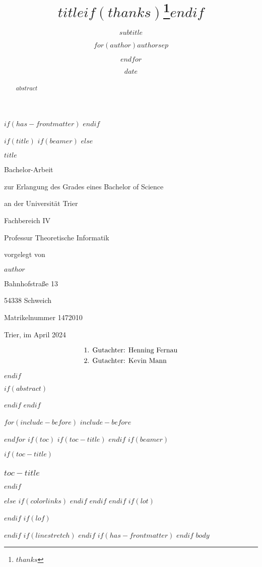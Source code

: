 \documentclass[
  $if(fontsize)$
  $fontsize$,
  $endif$
  $if(lang)$
  $babel-lang$,
  $endif$
  $if(papersize)$
  $papersize$paper,
  $endif$
  $if(beamer)$
  ignorenonframetext,
  $if(handout)$
  handout,
  $endif$
  $if(aspectratio)$
  aspectratio=$aspectratio$,
  $endif$
  $endif$
  $for(classoption)$
  $classoption$$sep$,
  $endfor$
]{$documentclass$}
\title{$title$$if(thanks)$\thanks{$thanks$}$endif$}
\subtitle{$subtitle$}
\author{$for(author)$$author$$sep$ \and $endfor$}
\date{$date$}
\institute{$for(institute)$$institute$$sep$ \and $endfor$}
\begin{document}
$if(has-frontmatter)$
\frontmatter
$endif$

$if(title)$
$if(beamer)$
\frame{\titlepage}
$else$
\begin{titlepage}
  \begin{center}
    \vspace*{1cm}

    \Huge
    \textbf{$title$}

    \vspace{2cm}
    \Large

    Bachelor-Arbeit

    zur Erlangung des Grades eines Bachelor of Science

    \vspace{1cm}

    an der Universität Trier 
    
    Fachbereich IV

    Professur Theoretische Informatik

    \vspace{2cm}
    vorgelegt von

    \textbf{$author$}

    Bahnhofstraße 13

    54338 Schweich

    Matrikelnummer 1472010
    \vfill

    Trier, im April 2024
    \vspace{1cm}


    \begin{align*}
      &\textnormal{1. Gutachter: Henning Fernau}\\
      &\textnormal{2. Gutachter: Kevin Mann}
    \end{align*}
    
    
  \end{center}
\end{titlepage}
$endif$


\clearpage


$if(abstract)$
\begin{abstract}
  $abstract$
\end{abstract}
$endif$
$endif$

$for(include-before)$
$include-before$

$endfor$
$if(toc)$
$if(toc-title)$
\renewcommand*\contentsname{$toc-title$}
$endif$
$if(beamer)$
\begin{frame}[allowframebreaks]
  $if(toc-title)$
  \frametitle{$toc-title$}
  $endif$
  \tableofcontents[hideallsubsections]
\end{frame}
$else$
{
    $if(colorlinks)$
    \hypersetup{linkcolor=$if(toccolor)$$toccolor$$else$$endif$}
    $endif$
    \setcounter{tocdepth}{$toc-depth$}
    \tableofcontents
  }
$endif$
$endif$
$if(lot)$
\listoftables
$endif$
$if(lof)$
\listoffigures
$endif$
$if(linestretch)$
$endif$
$if(has-frontmatter)$
\mainmatter
$endif$
$body$
\end{document}
